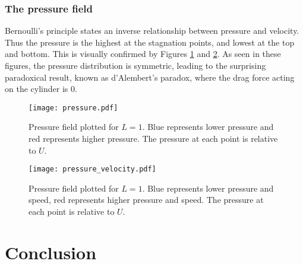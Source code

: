 \subsubsection{The pressure field}
Bernoulli's principle states an inverse relationship between pressure and velocity. Thus the pressure is the highest at the stagnation points,
and lowest at the top and bottom. This is visually confirmed by Figures \ref{figure:pressure:1} and \ref{figure:pressure:2}. As seen in these figures,
the pressure distribution is symmetric, leading to the surprising paradoxical result, known as d'Alembert's paradox, where the drag force acting on the cylinder is $0$.
\begin{figure}
	\centering
	\texttt{[image: pressure.pdf]}
	\caption{Pressure field plotted for $L=1$. Blue represents lower pressure and red represents higher pressure. The pressure at each point is relative to $U$.}
	\label{figure:pressure:1}
\end{figure}
\begin{figure}
	\centering
	\texttt{[image: pressure\_velocity.pdf]}
	\caption{Pressure field plotted for $L=1$. Blue represents lower pressure and speed, red represents higher pressure and speed. The pressure at each point is relative to $U$.}
	\label{figure:pressure:2}
\end{figure}

\section{Conclusion}